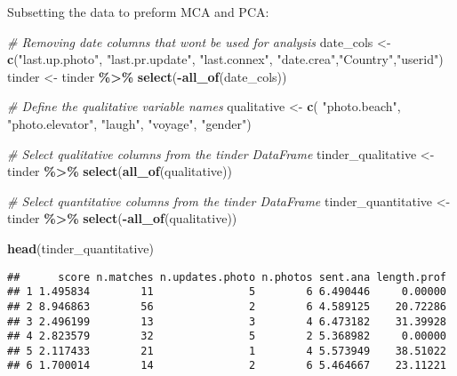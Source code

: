 \documentclass[
]{article}
\newenvironment{Shaded}{\begin{snugshade}}{\end{snugshade}}
\newcommand{\CommentTok}[1]{\textcolor[rgb]{0.56,0.35,0.01}{\textit{#1}}}
\newcommand{\FunctionTok}[1]{\textcolor[rgb]{0.13,0.29,0.53}{\textbf{#1}}}
\newcommand{\NormalTok}[1]{#1}
\newcommand{\OtherTok}[1]{\textcolor[rgb]{0.56,0.35,0.01}{#1}}
\newcommand{\SpecialCharTok}[1]{\textcolor[rgb]{0.81,0.36,0.00}{\textbf{#1}}}
\newcommand{\StringTok}[1]{\textcolor[rgb]{0.31,0.60,0.02}{#1}}
\begin{document}
Subsetting the data to preform MCA and PCA:

\begin{Shaded}
\begin{Highlighting}[]
\CommentTok{\# Removing date columns that won\textquotesingle{}t be used for analysis}
\NormalTok{date\_cols }\OtherTok{\textless{}{-}} \FunctionTok{c}\NormalTok{(}\StringTok{"last.up.photo"}\NormalTok{, }\StringTok{"last.pr.update"}\NormalTok{, }\StringTok{"last.connex"}\NormalTok{, }\StringTok{"date.crea"}\NormalTok{,}\StringTok{"Country"}\NormalTok{,}\StringTok{"userid"}\NormalTok{)}
\NormalTok{tinder }\OtherTok{\textless{}{-}}\NormalTok{ tinder }\SpecialCharTok{\%\textgreater{}\%} 
  \FunctionTok{select}\NormalTok{(}\SpecialCharTok{{-}}\FunctionTok{all\_of}\NormalTok{(date\_cols))}

\CommentTok{\# Define the qualitative variable names}
\NormalTok{qualitative }\OtherTok{\textless{}{-}} \FunctionTok{c}\NormalTok{( }\StringTok{"photo.beach"}\NormalTok{, }\StringTok{"photo.elevator"}\NormalTok{, }\StringTok{"laugh"}\NormalTok{, }\StringTok{"voyage"}\NormalTok{, }\StringTok{"gender"}\NormalTok{)}

\CommentTok{\# Select qualitative columns from the \textasciigrave{}tinder\textasciigrave{} DataFrame}
\NormalTok{tinder\_qualitative }\OtherTok{\textless{}{-}}\NormalTok{ tinder }\SpecialCharTok{\%\textgreater{}\%} 
  \FunctionTok{select}\NormalTok{(}\FunctionTok{all\_of}\NormalTok{(qualitative))}

\CommentTok{\# Select quantitative columns from the \textasciigrave{}tinder\textasciigrave{} DataFrame}
\NormalTok{tinder\_quantitative }\OtherTok{\textless{}{-}}\NormalTok{ tinder }\SpecialCharTok{\%\textgreater{}\%}
  \FunctionTok{select}\NormalTok{(}\SpecialCharTok{{-}}\FunctionTok{all\_of}\NormalTok{(qualitative))}


\FunctionTok{head}\NormalTok{(tinder\_quantitative)}
\end{Highlighting}
\end{Shaded}

\begin{verbatim}
##      score n.matches n.updates.photo n.photos sent.ana length.prof
## 1 1.495834        11               5        6 6.490446     0.00000
## 2 8.946863        56               2        6 4.589125    20.72286
## 3 2.496199        13               3        4 6.473182    31.39928
## 4 2.823579        32               5        2 5.368982     0.00000
## 5 2.117433        21               1        4 5.573949    38.51022
## 6 1.700014        14               2        6 5.464667    23.11221
\end{verbatim}
\end{document}
